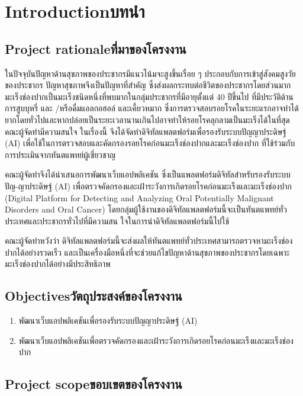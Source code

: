 \chapter{\ifenglish Introduction\else บทนำ\fi}

\section{\ifenglish Project rationale\else ที่มาของโครงงาน\fi}

ในปัจจุบันปัญหาด้านสุขภาพของประชากรมีแนวโน้มจะสูงขึ้นเรื่อย ๆ ประกอบกับการเข้าสู่สังคมสูงวัยของประชากร ปัญหาสุขภาพจึงเป็นปัญหาที่สำคัญ ซึ่งส่งผลกระทบต่อชีวิตของประชากรโดยส่วนมาก มะเร็งช่องปากเป็นมะเร็งชนิดหนึ่งที่พบมากในกลุ่มประชากรที่มีอายุตั้งแต่ 40 ปีขึ้นไป ที่มีประวัติด้านการสูบบุหรี่ และ
/หรือดื่มแอลกอฮอล์ และเคี้ยวหมาก ซึ่งการตรวจสอบรอยโรคในระยะแรกอาจทำได้ยากโดยทั่วไปและหากปล่อยเป็นระยะเวลานานเกินไปอาจทำให้รอยโรคลุกลามเป็นมะเร็งได้ในที่สุด คณะผู้จัดทำมีความสนใจ
ในเรื่องนี้ จึงได้จัดทำดิจิทัลแพลตฟอร์มเพื่อรองรับระบบปัญญาประดิษฐ์ (AI) เพื่อใช้ในการตรวจสอบและคัดกรองรอยโรคก่อนมะเร็งช่องปากและมะเร็งช่องปาก ที่ใช้ร่วมกับการประเมินจากทันตแพทย์ผู้เชี่ยวชาญ

คณะผู้จัดทำจึงได้นำเสนอการพัฒนาเว็บแอปพลิเคชัน ซึ่งเป็นแพลตฟอร์มดิจิทัลสำหรับรองรับระบบปัญ-ญาประดิษฐ์ (AI) เพื่อตรวจคัดกรองและเฝ้าระวังการเกิดรอยโรคก่อนมะเร็งและมะเร็งช่องปาก (Digital Platform for Detecting and Analyzing Oral Potentially Malignant Disorders and Oral Cancer) โดยกลุ่มผู้ใช้งานของดิจิทัลแพลตฟอร์มนี้จะเป็นทันตแพทย์ทั่วประเทศและประชากรทั่วไปที่มีความสน ใจในการนำดิจิทัลแพลตฟอร์มนี้ไปใช้

คณะผู้จัดทำหวังว่า ดิจิทัลแพลตฟอร์มนี้จะส่งผลให้ทันตแพทย์ทั่วประเทศสามารถตรวจหามะเร็งช่องปากได้อย่างรวดเร็ว และเป็นเครื่องมือหนึ่งที่จะช่วยแก้ไขปัญหาด้านสุขภาพของประชากรโดยเฉพาะมะเร็งช่องปากได้อย่างมีประสิทธิภาพ


\section{\ifenglish Objectives\else วัตถุประสงค์ของโครงงาน\fi}
\begin{enumerate}
    \item พัฒนาเว็บแอปพลิเคชันเพื่อรองรับระบบปัญญาประดิษฐ์ (AI)
    \item พัฒนาเว็บแอปพลิเคชันเพื่อตรวจคัดกรองและเฝ้าระวังการเกิดรอยโรคก่อนมะเร็งและมะเร็งช่องปาก
\end{enumerate}

\section{\ifenglish Project scope\else ขอบเขตของโครงงาน\fi}


